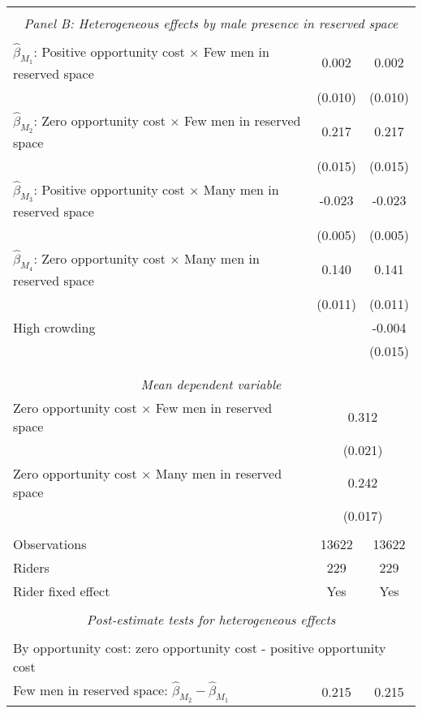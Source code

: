 \begin{tabular}{l*{2}{c}}
\hline \\[-1ex] \multicolumn{3}{c}{\textit{Panel B: Heterogeneous effects by male presence in reserved space}} \\\\[-1ex]
$\hat\beta_{M_1}$: Positive opportunity cost $\times$ Few men in reserved space&       0.002         &       0.002         \\
                    &     (0.010)         &     (0.010)         \\
[1em]
$\hat\beta_{M_2}$: Zero opportunity cost $\times$ Few men in reserved space&       0.217\sym{***}&       0.217\sym{***}\\
                    &     (0.015)         &     (0.015)         \\
[1em]
$\hat\beta_{M_3}$: Positive opportunity cost $\times$ Many men in reserved space&      -0.023\sym{***}&      -0.023\sym{***}\\
                    &     (0.005)         &     (0.005)         \\
[1em]
$\hat\beta_{M_4}$: Zero opportunity cost $\times$ Many men in reserved space&       0.140\sym{***}&       0.141\sym{***}\\
                    &     (0.011)         &     (0.011)         \\
[1em]
High crowding       &                     &      -0.004         \\
                    &                     &     (0.015)         \\
\\[-1.8ex] \hline \\[-1.8ex] \multicolumn{3}{c}{\textit{Mean dependent variable}} \\ Zero opportunity cost $\times$ Few men in reserved space & \multicolumn{2}{c}{0.312} \\ & \multicolumn{2}{c}{(0.021)} \\ Zero opportunity cost $\times$ Many men in reserved space & \multicolumn{2}{c}{0.242} \\ & \multicolumn{2}{c}{(0.017)} \\\\[-1ex] 
Observations        &       13622         &       13622         \\
Riders              &         229         &         229         \\
Rider fixed effect  &         Yes         &         Yes         \\
\hline \\[-1ex]  \multicolumn{3}{c}{\textit{Post-estimate tests for heterogeneous effects}} \\\\[-1ex] \multicolumn{3}{l}{By opportunity cost: zero opportunity cost - positive opportunity cost} \\ \quad Few men in reserved space: $\hat\beta_{M_2} - \hat\beta_{M_1}$&       0.215         &       0.215         \\

\end{tabular}
